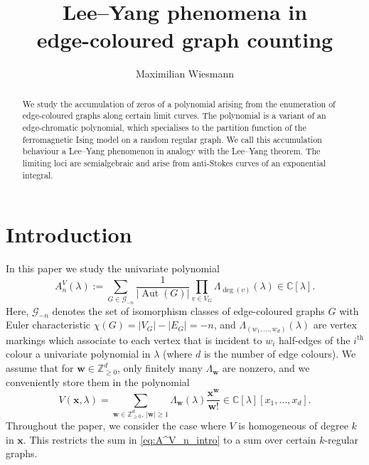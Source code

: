 \documentclass[11pt, a4paper]{article}
\title{\bf Lee--Yang phenomena in \\edge-coloured graph counting}
\date{}
\author{Maximilian Wiesmann}
\numberwithin{theorem}{section}
\theoremstyle{remark}
\newcommand{\GG}{\mathcal{G}}
\newcommand{\CC}{\mathbb{C}}
\newcommand{\ZZ}{\mathbb{Z}}
\DeclareMathOperator{\Aut}{Aut}
\newcommand{\bb}[1]{\boldsymbol{#1}}
\theoremstyle{theorem}
\begin{document}
\maketitle

\vspace{-3em}
\begin{abstract}
  We study the accumulation of zeros of a polynomial arising from the enumeration of edge-coloured graphs along certain limit curves. The polynomial is a variant of an edge-chromatic polynomial, which specialises to the partition function of the ferromagnetic Ising model on a random regular graph. We call this accumulation behaviour a Lee--Yang phenomenon in analogy with the Lee--Yang theorem. The limiting loci are semialgebraic and arise from anti-Stokes curves of an exponential integral. 
\end{abstract}



\section{Introduction}

In this paper we study the univariate polynomial
\begin{equation}
  \label{eq:A^V_n_intro}
  A^V_n(\lambda) := \sum_{G \in \GG_{-n}} \frac{1}{|\Aut(G)|}\prod_{v\in V_G} \Lambda_{\deg(v)}(\lambda) \in \CC[\lambda].
\end{equation}
Here, $\GG_{-n}$ denotes the set of isomorphism classes of edge-coloured graphs $G$ with Euler characteristic $\chi(G) = |V_G| - |E_G| = -n$, and $\Lambda_{(w_1,\dots,w_d)}(\lambda)$ are vertex markings which associate to each vertex that is incident to $w_i$ half-edges of the $i^{\text{th}}$ colour a univariate polynomial in $\lambda$ (where $d$ is the number of edge colours). We assume that for $\bb{w}\in\ZZ^d_{\geq 0}$, only finitely many $\Lambda_{\bb{w}}$ are nonzero, and we conveniently store them in the polynomial
\[
  V(\bb{x}, \lambda) = \sum_{\bb{w}\in \ZZ^d_{\geq 0},\, |\bb{w}| \geq 1} \Lambda_{\bb{w}}(\lambda) \frac{\bb{x}^{\bb{w}}}{\bb{w}!} \in \CC[\lambda][x_1,\dots,x_d].
\]
Throughout the paper, we consider the case where $V$ is homogeneous of degree $k$ in $\bb{x}$. This restricts the sum in \eqref{eq:A^V_n_intro} to a sum over certain $k$-regular graphs.\par
\end{document}
